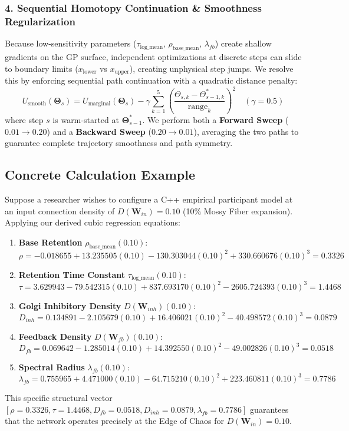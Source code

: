 \documentclass[11pt,a4paper]{article}
\begin{document}
\subsubsection{4. Sequential Homotopy Continuation \& Smoothness Regularization}
Because low-sensitivity parameters ($\tau_{\text{log\_mean}}$, $\rho_{\text{base\_mean}}$, $\lambda_{fb}$) create shallow gradients on the GP surface, independent optimizations at discrete steps can slide to boundary limits ($x_{\text{lower}}$ vs $x_{\text{upper}}$), creating unphysical step jumps. We resolve this by enforcing sequential path continuation with a quadratic distance penalty:
\begin{equation}
U_{\text{smooth}}(\boldsymbol{\Theta}_s) = U_{\text{marginal}}(\boldsymbol{\Theta}_s) - \gamma \sum_{k=1}^5 \left( \frac{\Theta_{s,k} - \Theta_{s-1,k}^*}{\text{range}_k} \right)^2 \quad (\gamma = 0.5)
\end{equation}
where step $s$ is warm-started at $\boldsymbol{\Theta}_{s-1}^*$. We perform both a \textbf{Forward Sweep} ($0.01 \to 0.20$) and a \textbf{Backward Sweep} ($0.20 \to 0.01$), averaging the two paths to guarantee complete trajectory smoothness and path symmetry.

\subsection{Concrete Calculation Example}
Suppose a researcher wishes to configure a C++ empirical participant model at an input connection density of $D(\mathbf{W}_{in}) = 0.10$ (10\% Mossy Fiber expansion). Applying our derived cubic regression equations:

\begin{enumerate}
    \item \textbf{Base Retention} $\rho_{\text{base\_mean}}(0.10)$:
    $$\rho = -0.018655 + 13.235505(0.10) - 130.303044(0.10)^2 + 330.660676(0.10)^3 = 0.3326$$
    \item \textbf{Retention Time Constant} $\tau_{\text{log\_mean}}(0.10)$:
    $$\tau = 3.629943 - 79.542315(0.10) + 837.693170(0.10)^2 - 2605.724393(0.10)^3 = 1.4468$$
    \item \textbf{Golgi Inhibitory Density} $D(\mathbf{W}_{inh})(0.10)$:
    $$D_{inh} = 0.134891 - 2.105679(0.10) + 16.406021(0.10)^2 - 40.498572(0.10)^3 = 0.0879$$
    \item \textbf{Feedback Density} $D(\mathbf{W}_{fb})(0.10)$:
    $$D_{fb} = 0.069642 - 1.285014(0.10) + 14.392550(0.10)^2 - 49.002826(0.10)^3 = 0.0518$$
    \item \textbf{Spectral Radius} $\lambda_{fb}(0.10)$:
    $$\lambda_{fb} = 0.755965 + 4.471000(0.10) - 64.715210(0.10)^2 + 223.460811(0.10)^3 = 0.7786$$
\end{enumerate}
This specific structural vector $[\rho=0.3326, \tau=1.4468, D_{fb}=0.0518, D_{inh}=0.0879, \lambda_{fb}=0.7786]$ guarantees that the network operates precisely at the Edge of Chaos for $D(\mathbf{W}_{in}) = 0.10$.
\end{document}
